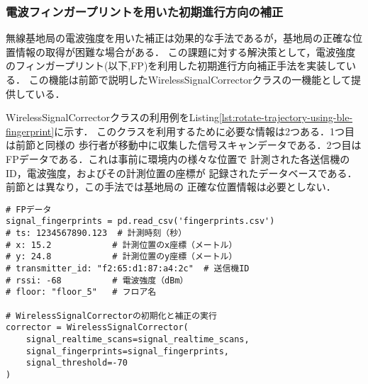 
\subsubsection{電波フィンガープリントを用いた初期進行方向の補正}
無線基地局の電波強度を用いた補正は効果的な手法であるが，基地局の正確な位置情報の取得が困難な場合がある．
この課題に対する解決策として，電波強度のフィンガープリント(以下,FP)を利用した初期進行方向補正手法を実装している．
この機能は前節で説明したWirelessSignalCorrectorクラスの一機能として提供している．

WirelessSignalCorrectorクラスの利用例をListing\ref{lst:rotate-trajectory-using-ble-fingerprint}に示す．
このクラスを利用するために必要な情報は2つある．1つ目は前節と同様の
歩行者が移動中に収集した信号スキャンデータである．2つ目は
FPデータである．これは事前に環境内の様々な位置で
計測された各送信機のID，電波強度，およびその計測位置の座標が
記録されたデータベースである．前節とは異なり，この手法では基地局の
正確な位置情報は必要としない．

\begin{lstlisting}[caption={WirelessSignalCorrectorの使用例},label=lst:rotate-trajectory-using-ble-fingerprint,float=ht]
# FPデータ
signal_fingerprints = pd.read_csv('fingerprints.csv')
# ts: 1234567890.123  # 計測時刻（秒）
# x: 15.2            # 計測位置のx座標（メートル）
# y: 24.8            # 計測位置のy座標（メートル）
# transmitter_id: "f2:65:d1:87:a4:2c"  # 送信機ID
# rssi: -68          # 電波強度（dBm）
# floor: "floor_5"   # フロア名

# WirelessSignalCorrectorの初期化と補正の実行
corrector = WirelessSignalCorrector(
    signal_realtime_scans=signal_realtime_scans,
    signal_fingerprints=signal_fingerprints,
    signal_threshold=-70
)
\end{lstlisting}


